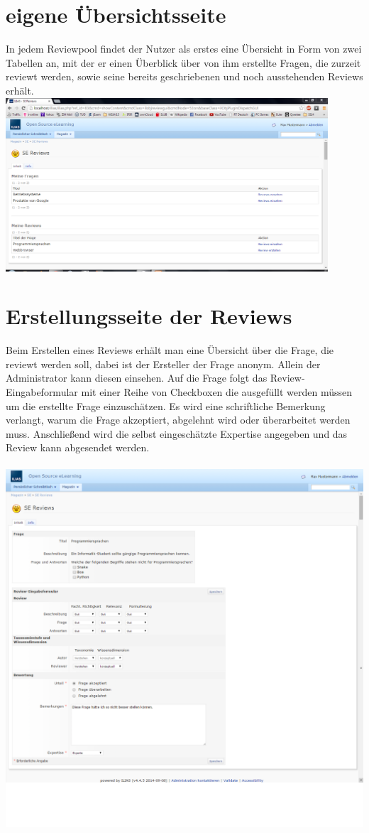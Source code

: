 \documentclass[12pt,a4paper]{scrreprt}
\begin{document}
\section{eigene \"Ubersichtsseite}
In jedem Reviewpool findet der Nutzer als erstes eine Übersicht in Form von zwei Tabellen an, mit der er einen Überblick über von ihm erstellte Fragen, die zurzeit reviewt werden, sowie seine bereits geschriebenen und noch ausstehenden Reviews erhält. 	\\
\includegraphics[width=0.9\textwidth]{uebersicht.png}

\section{Erstellungsseite der Reviews}
Beim Erstellen eines Reviews erhält man eine Übersicht über die Frage, die reviewt werden soll, dabei ist der Ersteller der Frage anonym. Allein der Administrator kann diesen einsehen.
Auf die Frage folgt das Review-Eingabeformular mit einer Reihe von Checkboxen die ausgefüllt werden müssen um die erstellte Frage einzuschätzen. Es wird eine schriftliche Bemerkung verlangt, warum die Frage akzeptiert, abgelehnt wird oder überarbeitet werden muss.
Anschließend wird die selbst eingeschätzte Expertise angegeben und das Review kann abgesendet werden.\\
\\
\includegraphics[width=1.0\textwidth]{reviewformular.png}
\end{document}
